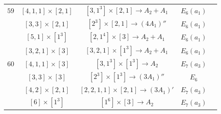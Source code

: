 \documentclass[reqno,12pt]{amsart}
\numberwithin{equation}{section}
\theoremstyle{plain}
\theoremstyle{definition}
\begin{document}
\begin{table}[htbp]
\begin{tabular}{|c|c|c|c|c|}
$59$ 
& $ [4,1,1]\times [2,1]$  &$[3,1^3]\times [2,1]\rightarrow A_2+A_1$  &   $E_6(a_1)$ \\
& $ [3,3]\times [2,1]$  &$[2^3]\times [2,1]\rightarrow (4A_1)''$ &   $E_6(a_1)$ \\
& $ [5,1]\times [1^3]$  &$[2,1^4]\times [3]\rightarrow A_2+A_1$  &   $E_6(a_1)$ \\
& $ [3,2,1]\times [3]$  &$[3,2,1]\times [1^3]\rightarrow A_2+A_1$  &   $E_6(a_1)$ \\
\hline

$60$ 
& $ [4,1,1]\times [3]$  &$[3,1^3]\times [1^3]\rightarrow A_2$  &   $E_7(a_3)$ \\
& $ [3,3]\times [3]$  &$[2^3]\times [1^3]\rightarrow (3A_1)''$  &   $E_6$ \\
& $ [4,2]\times [2,1]$  &$[2,2,1,1]\times [2,1]\rightarrow (3A_1)'$  &   $E_7(a_3)$ \\
& $ [6]\times [1^3]$  &$[1^6]\times [3]\rightarrow A_2$  &   $E_7(a_3)$ \\
\hline


\end{tabular}
	\bigskip
	
\end{table}

\hspace{3cm}
\end{document}
